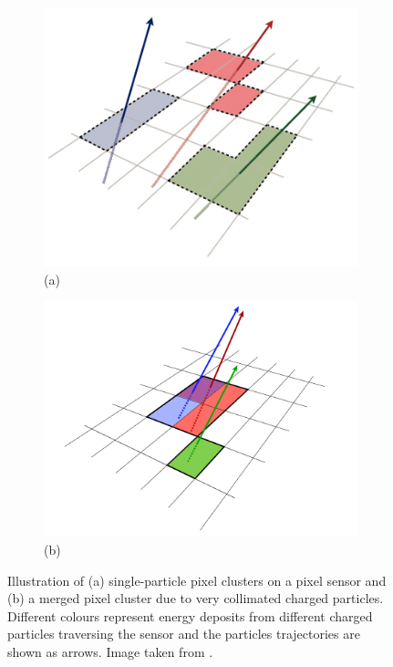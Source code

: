  \begin{figure}[bth]
    \centering
    \begin{subfigure}[t]{.38\linewidth}
        \includegraphics[width=1\textwidth]{Reconstruction_plots/single_cluster.png}
        \caption{(a)}
    \end{subfigure}
    \begin{subfigure}[t]{.38\linewidth}
        \includegraphics[width=1\textwidth]{Reconstruction_plots/merged_cluster.png}
        \caption{(b)}
    \end{subfigure}
    
    \caption{Illustration of (a) single-particle pixel clusters on a pixel sensor and (b) 
    a merged pixel cluster due to very collimated charged particles. 
    Different colours represent energy deposits from different charged particles 
    traversing the sensor and the particles trajectories are shown as arrows. 
    Image taken from \cite{PERF-2015-08}.}
    \label{fig:cluster}
\end{figure}
